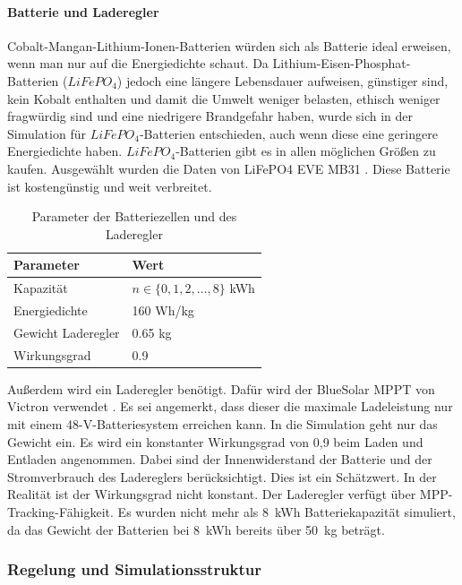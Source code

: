 \paragraph{Batterie und Laderegler}
Cobalt-Mangan-Lithium-Ionen-Batterien würden sich als Batterie ideal erweisen, wenn man nur auf die Energiedichte schaut. Da Lithium-Eisen-Phosphat-Batterien ($LiFePO_4$) jedoch eine längere Lebensdauer aufweisen, günstiger sind, kein Kobalt enthalten und damit die Umwelt weniger belasten, ethisch weniger fragwürdig sind und eine niedrigere Brandgefahr haben, wurde sich in der Simulation für $LiFePO_4$-Batterien entschieden, auch wenn diese eine geringere Energiedichte haben. $LiFePO_4$-Batterien gibt es in allen möglichen Größen zu kaufen. Ausgewählt wurden die Daten von LiFePO4 EVE MB31 \cite{battery}. Diese Batterie ist kostengünstig und weit verbreitet.
\begin{table}
\centering
\begin{tabular}{|l|l|}
\hline
\textbf{Parameter} & \textbf{Wert} \\ \hline
Kapazität & $ n \in \{0,1,2,\dots,8\}$ kWh \\ \hline
Energiedichte & 160 Wh/kg \\ \hline
Gewicht Laderegler & 0.65 kg \\ \hline
Wirkungsgrad & 0.9 \\ \hline
\end{tabular}
\caption{Parameter der Batteriezellen und des Laderegler \cite{battery,laderegler}}
\end{table}

Außerdem wird ein Laderegler benötigt. Dafür wird der BlueSolar MPPT von Victron verwendet \cite{laderegler}. Es sei angemerkt, dass dieser die maximale Ladeleistung nur mit einem 48-V-Batteriesystem erreichen kann. In die Simulation geht nur das Gewicht ein. Es wird ein konstanter Wirkungsgrad von 0,9 beim Laden und Entladen angenommen. Dabei sind der Innenwiderstand der Batterie und der Stromverbrauch des Ladereglers berücksichtigt. Dies ist ein Schätzwert. In der Realität ist der Wirkungsgrad nicht konstant. Der Laderegler verfügt über MPP-Tracking-Fähigkeit. Es wurden nicht mehr als 8~kWh Batteriekapazität simuliert, da das Gewicht der Batterien bei 8~kWh bereits über 50~kg beträgt.
\vspace{1cm}


\subsubsection{Regelung und Simulationsstruktur}

